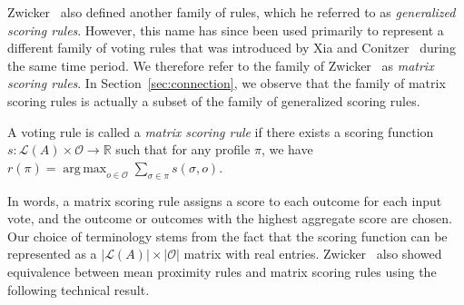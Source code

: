 \documentclass[prodmode]{acmsmall-ec14}
\newcommand{\calL}{{\mathcal{L}}}
\newcommand{\rank}{{\calL(A)}}
\newcommand{\calO}{{\mathcal{O}}}
\DeclareMathOperator*{\argmax}{arg\,max}
\DeclareMathOperator*{\argmin}{arg\,min}
\begin{document}
\noindent
Zwicker~ also defined another family of rules, which he referred to as \emph{generalized scoring rules}. However, this name has since been used primarily to represent a different family of voting rules that was introduced by Xia and Conitzer~ during the same time period. We therefore refer to the family of Zwicker~ as \emph{matrix scoring rules}. In Section~\ref{sec:connection}, we observe that the family of matrix scoring rules is actually a subset of the family of generalized scoring rules. 

\begin{definition}
A voting rule is called a \emph{matrix scoring rule} if there exists a scoring function $s : \rank \times \calO \rightarrow \mathbb{R}$ such that for any profile $\pi$, we have $r(\pi) = \argmax_{o \in \calO} \sum_{\sigma \in \pi} s(\sigma,o)$. 
\end{definition}



\noindent
In words, a matrix scoring rule assigns a score to each outcome for each input vote, and the outcome or outcomes with the highest aggregate score are chosen. Our choice of terminology stems from the fact that the scoring function can be represented as a $|\calL(A)| \times |\calO|$ matrix with real entries. Zwicker~ also showed equivalence between mean proximity rules and matrix scoring rules using the following technical result. %
\end{document}
